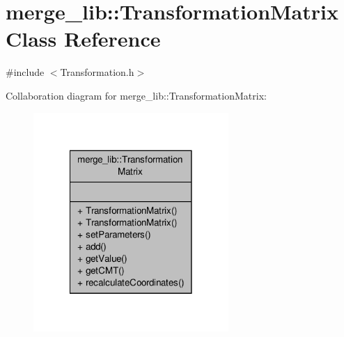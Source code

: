 \hypertarget{classmerge__lib_1_1_transformation_matrix}{\section{merge\-\_\-lib\-:\-:Transformation\-Matrix Class Reference}
\label{d2/d51/classmerge__lib_1_1_transformation_matrix}
}


{\ttfamily \#include $<$Transformation.\-h$>$}



Collaboration diagram for merge\-\_\-lib\-:\-:Transformation\-Matrix\-:
\nopagebreak
\begin{figure}[H]
\begin{center}
\leavevmode
\includegraphics[width=210pt]{db/d34/classmerge__lib_1_1_transformation_matrix__coll__graph}
\end{center}
\end{figure}
